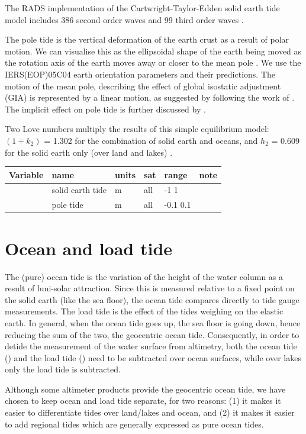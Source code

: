 \documentclass[a4paper,11pt,openany,natbib,nomargin]{thesis}
\newenvironment{vartable}{
\begin{table}[ht]
\small
\begin{tabular}{lllllr}
\hline\hline
Variable & name & units & sat & range & note \\
\hline\hline
}{
\hline
\end{tabular}
\end{table}
}
\begin{document}
The RADS implementation of the Cartwright-Taylor-Edden solid earth tide model includes 386 second order waves and 99 third order waves \citep{cartwright1971,cartwright1973}.

The pole tide is the vertical deformation of the earth crust as a result of polar motion. We can visualise this as the ellipsoidal shape of the earth being moved as the rotation axis of the earth moves away or closer to the mean pole \citep{munk1960}. We use the IERS(EOP)05C04 earth orientation parameters and their predictions. The motion of the mean pole, describing the effect of global isostatic adjustment (GIA) is represented by a linear motion, as suggested by \citet{wahr2015} following the work of \citet{argus2004}. The implicit effect on pole tide is further discussed by \citet{desai2015}.

Two Love numbers multiply the results of this simple equilibrium model: $(1 + k_2)$ = 1.302 for the combination of solid earth and oceans, and $h_2$ = 0.609 for the solid earth only (over land and lakes) \citep{wahr1985}.

\begin{vartable}
\var{tide_solid} & solid earth tide & m & all & -1 1 & \\
\var{tide_pole}  & pole tide        & m & all & -0.1 0.1 & \\
\end{vartable}

\section{Ocean and load tide}
\label{var:tide_ocean}\label{var:tide_load}
The (pure) ocean tide is the variation of the height of the water column as a result of luni-solar attraction. Since this is measured relative to a fixed point on the solid earth (like the sea floor), the ocean tide compares directly to tide gauge measurements. The load tide is the effect of the tides weighing on the elastic earth. In general, when the ocean tide goes up, the sea floor is going down, hence reducing the sum of the two, the geocentric ocean tide. Consequently, in order to detide the measurement of the water surface from altimetry, both the ocean tide () and the load tide () need to be subtracted over ocean surfaces, while over lakes only the load tide is subtracted.

Although some altimeter products provide the geocentric ocean tide, we have chosen to keep ocean and load tide separate, for two reasons: (1) it makes it easier to differentiate tides over land/lakes and ocean, and (2) it makes it easier to add regional tides which are generally expressed as pure ocean tides.
\end{document}
